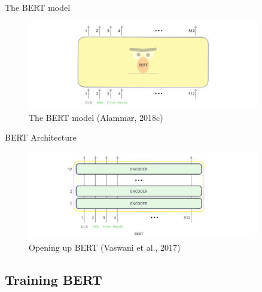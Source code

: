 \documentclass[10pt]{beamer}
\begin{document}
\begin{frame}{The BERT model}

\begin{figure}[h]
\centering
\includegraphics[width=0.9\textwidth]{fig/bert-input-output.png}
\caption{The BERT model (Alammar, 2018c)}
\end{figure}

\end{frame}


\begin{frame}{BERT Architecture}

\begin{figure}[h]
\centering
\includegraphics[width=0.9\textwidth]{fig/bert-encoders-input.png}
\caption{Opening up BERT (Vaswani et al., 2017)}
\end{figure}

\end{frame}



\subsection{Training BERT}
\end{document}

